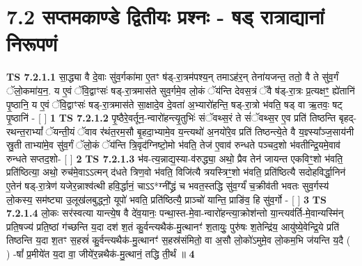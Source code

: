 \documentclass[17pt]{extarticle}
\begin{document}
     \section*{ 7.2      सप्तमकाण्डे द्वितीयः प्रश्नः - षड् रात्राद्यानां निरूपणं }
                                        \textbf{ TS 7.2.1.1} \newline
                  सा॒द्ध्या वै दे॒वाः सु॑व॒र्गका॑मा ए॒तꣳ ष॑ड्-रा॒त्रम॑पश्य॒न् तमाऽह॑र॒न् तेना॑यजन्त॒ ततो॒ वै ते सु॑व॒र्गं ॅलो॒कमा॑य॒न॒. य ए॒वं ॅवि॒द्वाꣳसः॑ षड्-रा॒त्रमास॑ते सुव॒र्गमे॒व लो॒कं ॅय॑न्ति देवस॒त्रं ॅवै ष॑ड्-रा॒त्रः प्र॒त्यक्षꣳ॒॒ ह्ये॑तानि॑ पृ॒ष्ठानि॒ य ए॒वं ॅवि॒द्वाꣳसः॑ षड्-रा॒त्रमास॑ते सा॒क्षादे॒व दे॒वता॑ अ॒भ्यारो॑हन्ति॒ षड्-रा॒त्रो भ॑वति॒ षड् वा ऋ॒तवः॒ षट् पृ॒ष्ठानि॑ - [  ] \textbf{  1} \newline
                  \newline
                                \textbf{ TS 7.2.1.2} \newline
                  पृ॒ष्ठैरे॒वर्तून॒-न्वारो॑हन्त्यृ॒तुभिः॑ संॅवथ्स॒रं ते सं॑ॅवथ्स॒र ए॒व प्रति॑ तिष्ठन्ति बृहद्-रथन्त॒राभ्यां᳚ ॅयन्ती॒यं ॅवाव र॑थंत॒रम॒सौ बृ॒हदा॒भ्यामे॒व य॒न्त्यथो॑ अ॒नयो॑रे॒व प्रति॑ तिष्ठन्त्ये॒ते वै य॒ज्ञ्स्या᳚ञ्ज॒साय॑नी स्रु॒ती ताभ्या॑मे॒व सु॑व॒र्गं ॅलो॒कं ॅय॑न्ति त्रि॒वृद॑ग्निष्टो॒मो भ॑वति॒ तेज॑ ए॒वाव॑ रुन्धते पञ्चद॒शो भ॑वतीन्द्रि॒यमे॒वाव॑ रुन्धते सप्तद॒शो- [  ] \textbf{  2} \newline
                  \newline
                                \textbf{ TS 7.2.1.3} \newline
                  भ॑व-त्य॒न्नाद्य॒स्या-व॑रुद्ध्या॒ अथो॒ प्रैव तेन॑ जायन्त एकविꣳ॒॒शो भ॑वति॒ प्रति॑ष्ठित्या॒ अथो॒ रुच॑मे॒वाऽऽत्मन् द॑धते त्रिण॒वो भ॑वति॒ विजि॑त्यै त्रयस्त्रिꣳ॒॒शो भ॑वति॒ प्रति॑ष्ठित्यै सदोहविर्द्धा॒निन॑ ए॒तेन॑ षड्-रा॒त्रेण॑ यजेर॒न्नाश्व॑त्थी हवि॒र्द्धानं॒ चाऽऽ*ग्नी᳚द्ध्रं च भवत॒स्तद्धि सु॑व॒र्ग्यं॑ च॒क्रीव॑ती भवतः सुव॒र्गस्य॑ लो॒कस्य॒ सम॑ष्ट्या उ॒लूख॑लबुद्ध्नो॒ यूपो॑ भवति॒ प्रति॑ष्ठित्यै॒ प्राञ्चो॑ यान्ति॒ प्राङि॑व॒ हि सु॑व॒र्गो - [  ] \textbf{  3} \newline
                  \newline
                                \textbf{ TS 7.2.1.4} \newline
                  लो॒कः सर॑स्वत्या यान्त्ये॒ष वै दे॑व॒यानः॒ पन्था॒स्त-मे॒वा-न्वारो॑हन्त्या॒क्रोश॑न्तो या॒न्त्यव॑र्ति-मे॒वान्यस्मि॑न् प्रति॒षज्य॑ प्रति॒ष्ठां ग॑च्छन्ति य॒दा दश॑ श॒तं कु॒र्वन्त्यथैक॑-मु॒त्थानꣳ॑ श॒तायुः॒ पुरु॑षः श॒तेन्द्रि॑य॒ आयु॑ष्ये॒वेन्द्रि॒ये प्रति॑ तिष्ठन्ति य॒दा श॒तꣳ स॒हस्रं॑ कु॒र्वन्त्यथैक॑-मु॒त्थानꣳ॑ स॒हस्र॑संमितो॒ वा अ॒सौ लो॒को॑ऽमुमे॒व लो॒कम॒भि ज॑यन्ति य॒दै ( ) -षां᳚ प्र॒मीये॑त य॒दा वा॒ जीये॑र॒न्नथैक॑-मु॒त्थानं॒ तद्धि ती॒र्थं ॥ \textbf{  4 } \newline
\end{document}
